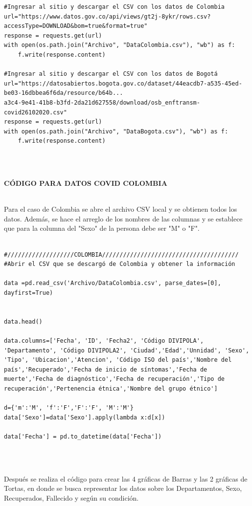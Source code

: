 \documentclass[conference,compsoc,onecolumn]{IEEEtran}
\begin{document}
\begin{lstlisting}
#Ingresar al sitio y descargar el CSV con los datos de Colombia
url="https://www.datos.gov.co/api/views/gt2j-8ykr/rows.csv?accessType=DOWNLOAD&bom=true&format=true"
response = requests.get(url)
with open(os.path.join("Archivo", "DataColombia.csv"), "wb") as f:
    f.write(response.content)

#Ingresar al sitio y descargar el CSV con los datos de Bogotá
url="https://datosabiertos.bogota.gov.co/dataset/44eacdb7-a535-45ed-be03-16dbbea6f6da/resource/b64b...
a3c4-9e41-41b8-b3fd-2da21d627558/download/osb_enftransm-covid26102020.csv"
response = requests.get(url)
with open(os.path.join("Archivo", "DataBogota.csv"), "wb") as f:
    f.write(response.content)

\end{lstlisting}
\\\

\textbf{CÓDIGO PARA DATOS COVID COLOMBIA}
\\\

Para el caso de Colombia  se abre el archivo CSV local y se obtienen todos los datos. Además, se hace el arreglo de los nombres de las columnas y se establece que para la columna del "Sexo" de la persona debe ser "M" o "F".
\\\
\begin{lstlisting}
#///////////////////COLOMBIA///////////////////////////////////////
#Abrir el CSV que se descargó de Colombia y obtener la información

data =pd.read_csv('Archivo/DataColombia.csv', parse_dates=[0], dayfirst=True)


data.head()

data.columns=['Fecha', 'ID', 'Fecha2', 'Código DIVIPOLA', 'Departamento', 'Código DIVIPOLA2', 'Ciudad','Edad','Unnidad', 'Sexo', 'Tipo', 'Ubicacion','Atencion', 'Código ISO del país','Nombre del país','Recuperado','Fecha de inicio de síntomas','Fecha de muerte','Fecha de diagnóstico','Fecha de recuperación','Tipo de recuperación','Pertenencia étnica','Nombre del grupo étnico']

d={'m':'M', 'f':'F','F':'F', 'M':'M'}
data['Sexo']=data['Sexo'].apply(lambda x:d[x])

data['Fecha'] = pd.to_datetime(data['Fecha'])
\end{lstlisting}
\\\

Después se realiza el código para crear las 4 gráficas de Barras y las 2 gráficas de Tortas, en donde se busca representar los datos sobre los Departamentos, Sexo, Recuperados, Fallecido y según su condición.
\\\
\end{document}
